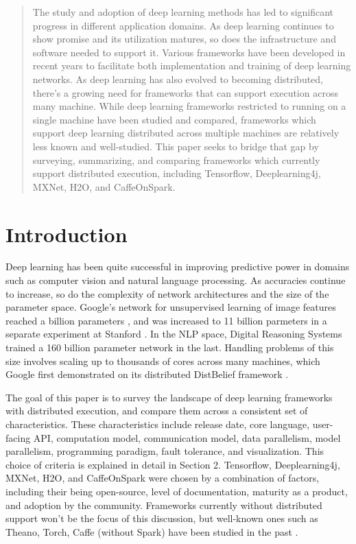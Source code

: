 \documentclass{article}
\begin{document}
\begin{abstract}
The study and adoption of deep learning methods has led to significant progress in different application domains. As deep learning continues to show promise and its utilization matures, so does the infrastructure and software needed to support it. Various frameworks have been developed in recent years to facilitate both implementation and training of deep learning networks. As deep learning has also evolved to becoming distributed, there's a growing need for frameworks that can support execution across many machine. While deep learning frameworks restricted to running on a single machine have been studied and compared, frameworks which support deep learning distributed across multiple machines are relatively less known and well-studied. This paper seeks to bridge that gap by surveying, summarizing, and comparing frameworks which currently support distributed execution, including Tensorflow, Deeplearning4j, MXNet, H2O, and CaffeOnSpark. 
\end{abstract}

\section{Introduction}
Deep learning has been quite successful in improving predictive power in domains such as computer vision and natural language processing. As accuracies continue to  increase, so do the complexity of network architectures and the size of the parameter space. Google's network for unsupervised learning of image features reached a billion parameters \cite{donahue2014decaf}, and was increased to 11 billion parmeters in a separate experiment at Stanford \cite{schmidhuber2015deep}. In the NLP space, Digital Reasoning Systems trained a 160 billion parameter network \cite{trask2015modeling} in the last. Handling problems of this size involves scaling up to thousands of cores across many machines, which Google first demonstrated on its distributed DistBelief framework \cite{dean2012large}.

The goal of this paper is to survey the landscape of deep learning frameworks with distributed execution, and compare them across a consistent set of characteristics. These characteristics include release date, core language, user-facing API, computation model, communication model, data parallelism, model parallelism, programming paradigm, fault tolerance, and visualization. This choice of criteria is explained in detail in Section 2. Tensorflow, Deeplearning4j, MXNet, H2O, and CaffeOnSpark were chosen by a combination of factors, including their being open-source, level of documentation, maturity as a product, and adoption by the community. Frameworks currently without distributed support won't be the focus of this discussion, but well-known ones such as Theano, Torch, Caffe (without Spark) have been studied in the past \cite{DBLP:journals/corr/BahrampourRSS15}. 
\end{document}
